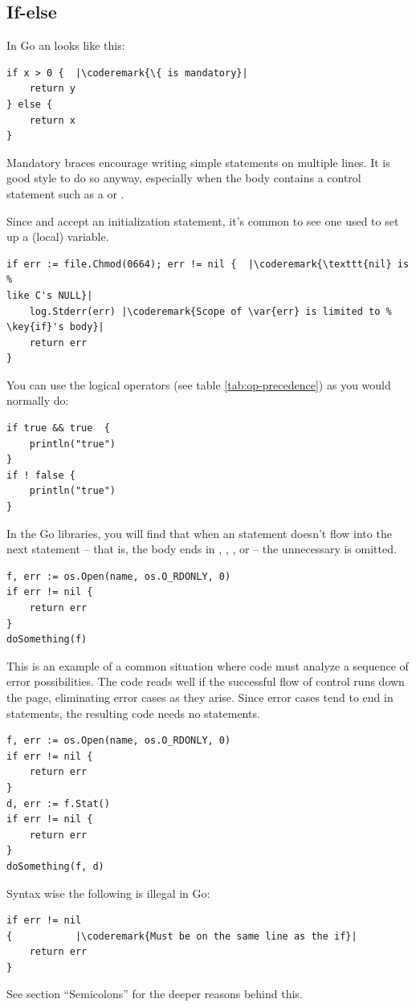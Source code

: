 \subsection{If-else}
In Go an  looks like this:
\begin{lstlisting}
if x > 0 {	|\coderemark{\{ is mandatory}|
    return y
} else {
    return x
}
\end{lstlisting}
Mandatory braces encourage writing simple  statements on multiple
lines. It is good style to do so anyway, especially when the body
contains a control statement such as a
 or
.

Since  and  accept an initialization statement, it's common to
see one used to set up a (local) variable.
\begin{lstlisting}
if err := file.Chmod(0664); err != nil {  |\coderemark{\texttt{nil} is %
like C's NULL}|
    log.Stderr(err) |\coderemark{Scope of \var{err} is limited to %
\key{if}'s body}|
    return err
}
\end{lstlisting}
You can use the logical operators (see table \ref{tab:op-precedence}) as
you would normally do:
\begin{lstlisting}
if true && true  {
    println("true")
}
if ! false {
    println("true")
}
\end{lstlisting}

In the Go libraries, you will find that when an  statement doesn't flow
into the next statement -- that is, the body ends in ,
, ,
or  -- the unnecessary  is omitted.

\begin{lstlisting}
f, err := os.Open(name, os.O_RDONLY, 0)
if err != nil {
    return err
}
doSomething(f)
\end{lstlisting}
This is an example of a common situation where code must analyze a
sequence of error possibilities. The code reads well if the successful
flow of control runs down the page, eliminating error cases as they
arise. Since error cases tend to end in  statements, the resulting
code needs no  statements.
\begin{lstlisting}
f, err := os.Open(name, os.O_RDONLY, 0)
if err != nil {
    return err
}
d, err := f.Stat()
if err != nil {
    return err
}
doSomething(f, d)
\end{lstlisting}
Syntax wise the following is illegal in Go:
\begin{lstlisting}
if err != nil
{		    |\coderemark{Must be on the same line as the if}|
    return err
}
\end{lstlisting}
See \cite{effective_go} section ``Semicolons'' for the deeper reasons
behind this.

